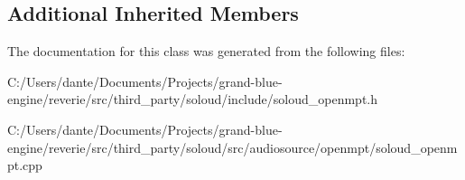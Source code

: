 \subsection*{Additional Inherited Members}


The documentation for this class was generated from the following files\+:\begin{DoxyCompactItemize}
\item 
C\+:/\+Users/dante/\+Documents/\+Projects/grand-\/blue-\/engine/reverie/src/third\+\_\+party/soloud/include/soloud\+\_\+openmpt.\+h\item 
C\+:/\+Users/dante/\+Documents/\+Projects/grand-\/blue-\/engine/reverie/src/third\+\_\+party/soloud/src/audiosource/openmpt/soloud\+\_\+openmpt.\+cpp\end{DoxyCompactItemize}
